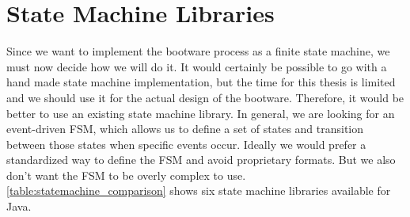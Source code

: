 \section{State Machine Libraries}
\label{implementation:selecting:statemachine}

Since we want to implement the bootware process as a finite state machine, we must now decide how we will do it.
It would certainly be possible to go with a hand made state machine implementation, but the time for this thesis is limited and we should use it for the actual design of the bootware.
Therefore, it would be better to use an existing state machine library.
In general, we are looking for an event-driven FSM, which allows us to define a set of states and transition between those states when specific events occur.
Ideally we would prefer a standardized way to define the FSM and avoid proprietary formats.
But we also don't want the FSM to be overly complex to use.
\autoref{table:statemachine_comparison} shows six state machine libraries available for Java.

